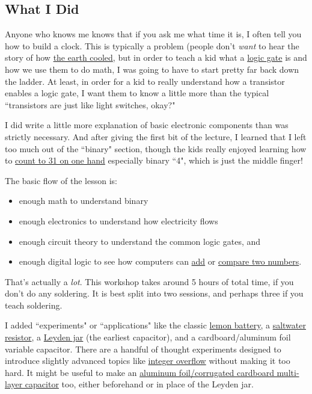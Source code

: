 \subsection*{What I Did}
Anyone who knows me knows that if you ask me what time it is, I often tell you how to build a clock. This is typically a problem (people don't \emph{want} to hear the story of how {\color{webblue}\href{http://www.imdb.com/title/tt0083530/quotes#qt1422044}{the earth cooled}}, but in order to teach a kid what a {\color{webblue}\href{https://en.wikipedia.org/wiki/Logic_gate}{logic gate}} is and how we use them to do math, I was going to have to start pretty far back down the ladder. At least, in order for a kid to really understand how a transistor enables a logic gate, I want them to know a little more than the typical ``transistors are just like light switches, okay?"

I did write a little more explanation of basic electronic components than was strictly necessary. And after giving the first bit of the lecture, I learned that I left too much out of the ``binary" section, though the kids really enjoyed learning how to {\color{webblue}\href{https://en.wikipedia.org/wiki/Finger_binary}{count to 31 on one hand}} especially binary ``4", which is just the middle finger!

The basic flow of the lesson is:
\begin{itemize}
\item enough math to understand binary
\item enough electronics to understand how electricity flows
\item enough circuit theory to understand the common logic gates, and
\item enough digital logic to see how computers can {\color{webblue}\href{https://en.wikipedia.org/wiki/Adder_(electronics)}{add}} or {\color{webblue}\href{https://en.wikipedia.org/wiki/XNOR_gate}{compare two numbers}}.
\end{itemize} 

That's actually a \emph{lot}. This workshop takes around 5 hours of total time, if you don't do any soldering.
It is best split into two sessions, and perhaps three if you teach soldering.


I added ``experiments" or ``applications" like the classic {\color{webblue}\href{https://en.wikipedia.org/wiki/Lemon_battery}{lemon battery}}, a {\color{webblue}\href{https://en.wikipedia.org/wiki/Liquid_rheostat}{saltwater resistor}}, a {\color{webblue}\href{https://en.wikipedia.org/wiki/Leyden_jar}{Leyden jar}} (the earliest capacitor), and a cardboard/aluminum foil variable capacitor. There are a handful of thought experiments designed to introduce slightly advanced topics like {\color{webblue}\href{https://en.wikipedia.org/wiki/Integer_overflow}{integer overflow}} without making it too hard. It might be useful to make an {\color{webblue}\href{http://bizarrelabs.com/crystal.htm}{aluminum foil/corrugated cardboard multi-layer capacitor}} too, either beforehand or in place of the Leyden jar.

